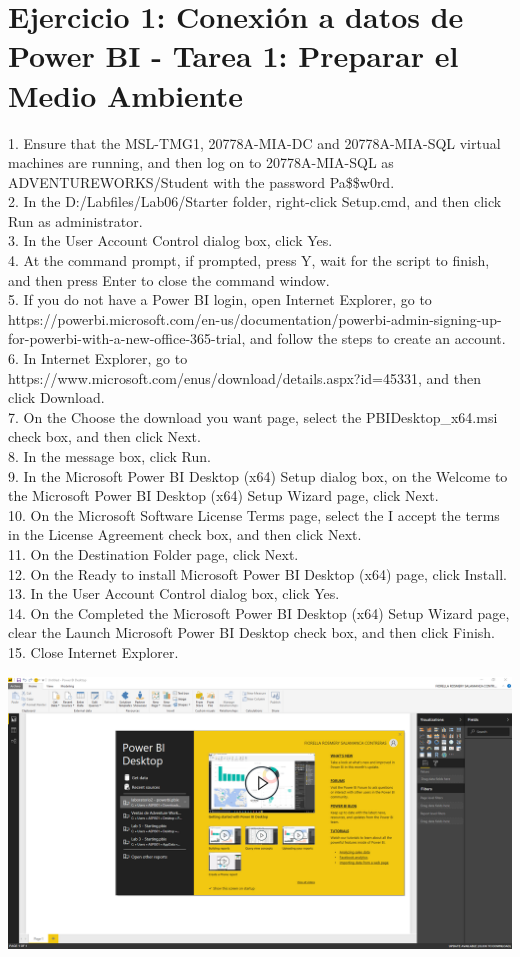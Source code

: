 \section{Ejercicio 1: Conexión a datos de Power BI - Tarea 1: Preparar el Medio Ambiente} 

1. Ensure that the MSL-TMG1, 20778A-MIA-DC and 20778A-MIA-SQL virtual machines are running, and then log on to 20778A-MIA-SQL as ADVENTUREWORKS/Student with the password Pa\$\$w0rd. \\
2. In the D:/Labfiles/Lab06/Starter folder, right-click Setup.cmd, and then click Run as administrator. \\
3. In the User Account Control dialog box, click Yes. \\
4. At the command prompt, if prompted, press Y, wait for the script to finish, and then press Enter to close the command window. \\
5. If you do not have a Power BI login, open Internet Explorer, go to https://powerbi.microsoft.com/en-us/documentation/powerbi-admin-signing-up-for-powerbi-with-a-new-office-365-trial, and follow the steps to create an account. \\
6. In Internet Explorer, go to https://www.microsoft.com/enus/download/details.aspx?id=45331, and then click Download. \\
7. On the Choose the download you want page, select the PBIDesktop\_x64.msi check box, and then click Next.\\
8. In the message box, click Run. \\
9. In the Microsoft Power BI Desktop (x64) Setup dialog box, on the Welcome to the Microsoft Power BI Desktop (x64) Setup Wizard page, click Next.\\
10. On the Microsoft Software License Terms page, select the I accept the terms in the License Agreement check box, and then click Next.\\
11. On the Destination Folder page, click Next.\\
12. On the Ready to install Microsoft Power BI Desktop (x64) page, click Install.\\
13. In the User Account Control dialog box, click Yes.\\
14. On the Completed the Microsoft Power BI Desktop (x64) Setup Wizard page, clear the Launch Microsoft Power BI Desktop check box, and then click Finish.\\
15. Close Internet Explorer.\\

	\begin{center}
	\includegraphics[width=15cm]{./Imagenes/Ejercicio1/Tarea2/3}
	\end{center}	